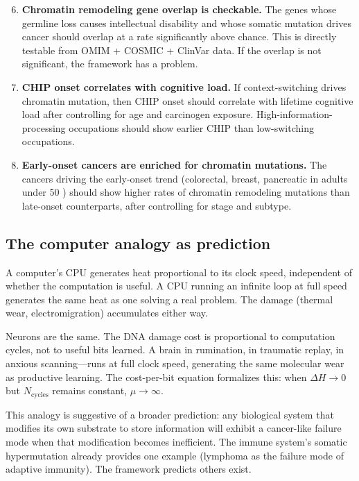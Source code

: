 \documentclass[11pt]{article}
\theoremstyle{definition}
\begin{document}
\begin{enumerate}
\setcounter{enumi}{5}
\item \textbf{Chromatin remodeling gene overlap is checkable.}
The genes whose germline loss causes intellectual disability
and whose somatic mutation drives cancer should overlap at a rate
significantly above chance. This is directly testable from
OMIM + COSMIC + ClinVar data. If the overlap is not significant,
the framework has a problem.

\item \textbf{CHIP onset correlates with cognitive load.}
If context-switching drives chromatin mutation, then CHIP onset
should correlate with lifetime cognitive load after controlling
for age and carcinogen exposure. High-information-processing
occupations should show earlier CHIP than low-switching occupations.

\item \textbf{Early-onset cancers are enriched for chromatin
mutations.} The cancers driving the early-onset trend (colorectal,
breast, pancreatic in adults under 50 \cite{Sung2024}) should show
higher rates of chromatin remodeling mutations than late-onset
counterparts, after controlling for stage and subtype.
\end{enumerate}

\subsection{The computer analogy as prediction}

A computer's CPU generates heat proportional to its clock speed,
independent of whether the computation is useful. A CPU running
an infinite loop at full speed generates the same heat as one
solving a real problem. The damage (thermal wear, electromigration)
accumulates either way.

Neurons are the same. The DNA damage cost is proportional to
computation cycles, not to useful bits learned. A brain in
rumination, in traumatic replay, in anxious scanning---runs at
full clock speed, generating the same molecular wear as productive
learning. The cost-per-bit equation formalizes this: when $\Delta H
\to 0$ but $N_{\text{cycles}}$ remains constant, $\mu \to \infty$.

This analogy is suggestive of a broader prediction: any biological
system that modifies its own substrate to store information will
exhibit a cancer-like failure mode when that modification becomes
inefficient. The immune system's somatic hypermutation already
provides one example (lymphoma as the failure mode of adaptive
immunity). The framework predicts others exist.
\end{document}
